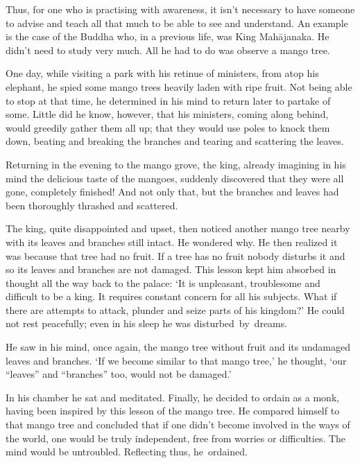 Thus, for one who is practising with awareness, it isn't necessary to have someone to advise and teach all that much to be able to see and understand. An example is the case of the Buddha who, in a previous life, was King Mah\=ajanaka. He didn't need to study very much. All he had to do was observe a mango tree.

One day, while visiting a park with his retinue of ministers, from atop his elephant, he spied some mango trees heavily laden with ripe fruit. Not being able to stop at that time, he determined in his mind to return later to partake of some. Little did he know, however, that his ministers, coming along behind, would greedily gather them all up; that they would use poles to knock them down, beating and breaking the branches and tearing and scattering the leaves.

Returning in the evening to the mango grove, the king, already imagining in his mind the delicious taste of the mangoes, suddenly discovered that they were all gone, completely finished! And not only that, but the branches and leaves had been thoroughly thrashed and scattered.

The king, quite disappointed and upset, then noticed another mango tree nearby with its leaves and branches still intact. He wondered why. He then realized it was because that tree had no fruit. If a tree has no fruit nobody disturbs it and so its leaves and branches are not damaged. This lesson kept him absorbed in thought all the way back to the palace: `It is unpleasant, troublesome and difficult to be a king. It requires constant concern for all his subjects. What if there are attempts to attack, plunder and seize parts of his kingdom?' He could not rest peacefully; even in his sleep he was disturbed~by~dreams.

He saw in his mind, once again, the mango tree without fruit and its undamaged leaves and branches. `If we become similar to that mango tree,' he thought, `our ``leaves'' and ``branches'' too, would not be damaged.'

In his chamber he sat and meditated. Finally, he decided to ordain as a monk, having been inspired by this lesson of the mango tree. He compared himself to that mango tree and concluded that if one didn't become involved in the ways of the world, one would be truly independent, free from worries or difficulties. The mind would be untroubled. Reflecting thus, he~ordained.

